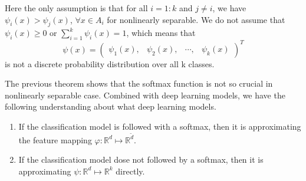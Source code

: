 
\begin{remark}
Here the only assumption is that for all $i = 1:k$ and $ j \neq i$, we have $\psi_i (x) > \psi_j (x)$, $\forall x \in A_i$ for nonlinearly separable. We do not assume that $\psi_i (x) \ge 0$ or $\displaystyle\sum_{i=1}^k \psi_i (x) = 1$, which means that 
$$\psi(x) = \begin{pmatrix}
\psi_1 (x), &\psi_2 (x), &\cdots, &\psi_k (x)
\end{pmatrix}^T$$ 
is not a discrete probability distribution over all k classes. 
\end{remark}


The previous theorem shows that the softmax function is not so crucial in nonlinearly separable case. Combined with deep learning models, we have the 
following understanding about what deep learning models.
\begin{enumerate}
	\item If  the classification model is followed with a softmax, then it is approximating the feature mapping $\varphi: \mathbb{R}^d \mapsto \mathbb{R}^{\tilde d}$.
	\item If the classification model dose not followed by a softmax, then it is approximating $\psi: \mathbb{R}^d \mapsto \mathbb{R}^{k}$ directly.
\end{enumerate}
 
